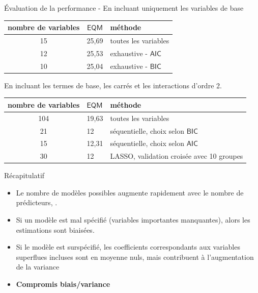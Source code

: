 \documentclass[
  ignorenonframetext,
]{beamer}
\providecommand{\tightlist}{%
  \setlength{\itemsep}{0pt}\setlength{\parskip}{0pt}}\usepackage{longtable,booktabs,array}
\begin{document}
\begin{frame}{Évaluation de la performance -}
\protect\hypertarget{uxe9valuation-de-la-performance--}{}
En incluant uniquement les variables de base

\begin{longtable}[]{@{}ccl@{}}
\toprule()
nombre de variables & \(\mathsf{EQM}\) & méthode \\
\midrule()
\endhead
15 & 25,69 & toutes les variables \\
12 & 25,53 & exhaustive - \(\mathsf{AIC}\) \\
10 & 25,04 & exhaustive - \(\mathsf{BIC}\) \\
\bottomrule()
\end{longtable}

En incluant les termes de base, les carrés et les interactions d'ordre
2.

\begin{longtable}[]{@{}cll@{}}
\toprule()
nombre de variables & \(\mathsf{EQM}\) & méthode \\
\midrule()
\endhead
104 & 19,63 & toutes les variables \\
21 & 12 & séquentielle, choix selon \(\mathsf{BIC}\) \\
15 & 12,31 & séquentielle, choix selon \(\mathsf{AIC}\) \\
30 & 12 & LASSO, validation croisée avec 10 groupes \\
\bottomrule()
\end{longtable}
\end{frame}

\begin{frame}{Récapitulatif}
\protect\hypertarget{ruxe9capitulatif}{}
\begin{itemize}
\tightlist
\item
  Le nombre de modèles possibles augmente rapidement avec le nombre de
  prédicteurs, .
\item
  Si un modèle est mal spécifié (variables importantes manquantes),
  alors les estimations sont biaisées.
\item
  Si le modèle est surspécifié, les coefficients correspondants aux
  variables superflues incluses sont en moyenne nuls, mais contribuent à
  l'augmentation de la variance
\item
  \textbf{Compromis biais/variance}
\end{itemize}
\end{frame}
\end{document}
